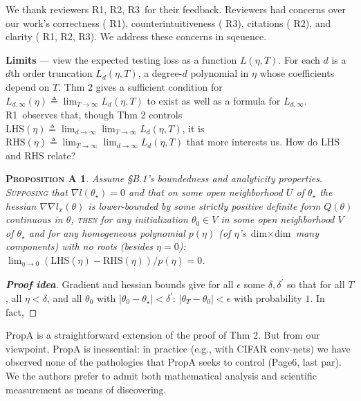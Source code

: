 \documentclass{article}
\newcommand{\Ra}{\textmd{\textsf{\color{purple!50} {R1}}}}
\newcommand{\Rb}{\textmd{\textsf{\color{green!50}  {R2}}}}
\newcommand{\Rc}{\textmd{\textsf{\color{blue!50}   {R3}}}}
\newcommand{\pag}[1]{\textmd{\textsf{Page#1}}}
\newcommand{\thm}[1]{\textmd{\textsf{Thm #1}}}
\newcommand{\prp}[1]{\textmd{\textsf{Prop#1}}}
\newcommand{\moosect}[1]{\par\noindent\textbf{#1} ---}
\newtheorem*{proposition*}{{\textsc{Proposition A}}}
\begin{document}
    We thank reviewers \Ra, \Rb, \Rc\ for their feedback.  Reviewers had
    concerns over our work's correctness (\Ra), counterintuitiveness (\Rc), 
    citations (\Rb), and clarity (\Ra,\Rb,\Rc).  We address these concerns in
    sqeuence. 

\moosect{Limits}
    view the expected testing loss as a function
    $L(\eta, T)$.  For each $d$ is a $d$th order truncation $L_d(\eta, T)$, a
    degree-$d$ polynomial in $\eta$ whose coefficients depend on $T$.
    \thm{2} gives a sufficient condition for $L_{d,\infty}(\eta) \triangleq
    \lim_{T\to\infty} L_{d}(\eta,T)$ to exist as well as 
    a formula for $L_{d,\infty}$. %
    \Ra\ observes that, though \thm{2} controls
    $\text{LHS}(\eta)\triangleq \lim_{d\to\infty} \lim_{T\to \infty}
    L_d(\eta,T)$, it is $\text{RHS}(\eta)\triangleq \lim_{T\to\infty}
    \lim_{d\to\infty} L_d(\eta,T)$ that more interests us.  How do LHS and
    RHS relate?
    \begin{proposition*}\vspace{-0.25cm}
        Assume \S B.1's boundedness and analyticity properties.
        \textsc{Supposing} that $\nabla l(\theta_\star)=0$ and that on some
        open neighborhood $U$ of $\theta_\star$ the hessian $\nabla\nabla
        l_x(\theta)$ is lower-bounded by some strictly positive definite form
        $Q(\theta)$ continuous in $\theta$, \textsc{then} for any
        initialization $\theta_0\in V$ in some open neighborhood $V$ of
        $\theta_\star$ and for any homogeneous polynomial $p(\eta)$ (of
        $\eta$'s $\text{dim}\times\text{dim}$ many components) with no roots
        (besides $\eta=0$): $\lim_{\eta\to 0}
        (\text{LHS}(\eta)-\text{RHS}(\eta))/p(\eta) = 0$.\vspace{-0.25cm}
    \end{proposition*}
    \begin{proof}[\textbf{Proof idea}]
        Gradient and hessian bounds give for all $\epsilon$ some
        $\delta,\delta^\prime$ so that for all $T$, all $\eta<\delta$, and all
        $\theta_0$ with $|\theta_0-\theta_\star|<\delta^\prime$:
        $|\theta_T-\theta_0|<\epsilon$ with probability $1$.
        In fact, 
        \vspace{-0.25cm}
    \end{proof}
    \prp{A} is a straightforward extension of the proof of \thm{2}.  But from
    our viewpoint, \prp{A} is inessential: in practice (e.g.,
    with CIFAR conv-nets) we have observed none of the pathologies that \prp{A}
    seeks to control (\pag{6, last par}).  We the authors prefer to admit both
    mathematical analysis and scientific measurement as means of
    discovering.   
\end{document}
